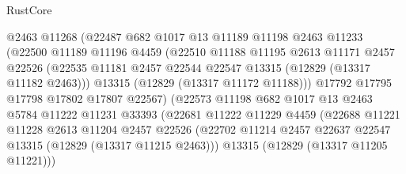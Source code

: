 \begin{lexlean}{RustCore}
\begin{coremodule}
                          @2463
                          @11268
                          (@22487
                            @682
                            @1017
                            @13
                            @11189
                            @11198
                            @2463
                            @11233
                            (@22500
                              @11189
                              @11196
                              @4459
                              (@22510
                                @11188
                                @11195
                                @2613
                                @11171
                                @2457
                                @22526
                                (@22535
                                  @11181
                                  @2457
                                  @22544
                                  @22547
                                  @13315
                                  (@12829 (@13317 @11182 @2463)))
                                @13315
                                (@12829 (@13317 @11172 @11188)))
                              @17792
                              @17795
                              @17798
                              @17802
                              @17807
                              @22567)
                            (@22573
                              @11198
                              @682
                              @1017
                              @13
                              @2463
                              @5784
                              @11222
                              @11231
                              @33393
                              (@22681
                                @11222
                                @11229
                                @4459
                                (@22688
                                  @11221
                                  @11228
                                  @2613
                                  @11204
                                  @2457
                                  @22526
                                  (@22702
                                    @11214
                                    @2457
                                    @22637
                                    @22547
                                    @13315
                                    (@12829 (@13317 @11215 @2463)))
                                  @13315
                                  (@12829 (@13317 @11205 @11221)))

\end{coremodule}
\end{lexlean}
